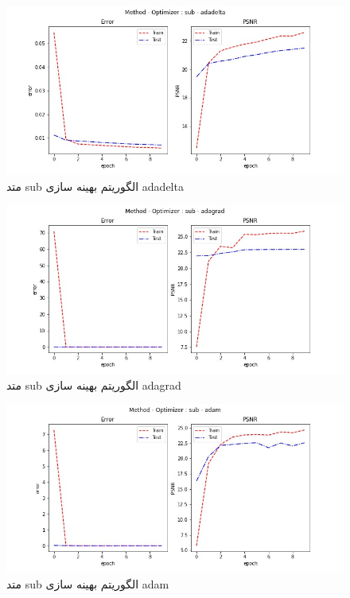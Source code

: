  \begin{figure}[!h] 
       \centering 
       \includegraphics[width=160mm]{./chapter3/images/error-psnr-sub-adadelta.jpg}
       \caption{متد sub الگوریتم بهینه سازی adadelta}
       \label{fig:error-psnr-sub-adadelta}
 \end{figure}
 \begin{figure}[!h] 
       \centering 
       \includegraphics[width=160mm]{./chapter3/images/error-psnr-sub-adagrad.jpg}
       \caption{متد sub الگوریتم بهینه سازی adagrad}
       \label{fig:error-psnr-sub-adagrad}
 \end{figure}
 \begin{figure}[!h] 
       \centering 
       \includegraphics[width=160mm]{./chapter3/images/error-psnr-sub-adam.jpg}
       \caption{متد sub الگوریتم بهینه سازی adam}
       \label{fig:error-psnr-sub-adam}
 \end{figure}
